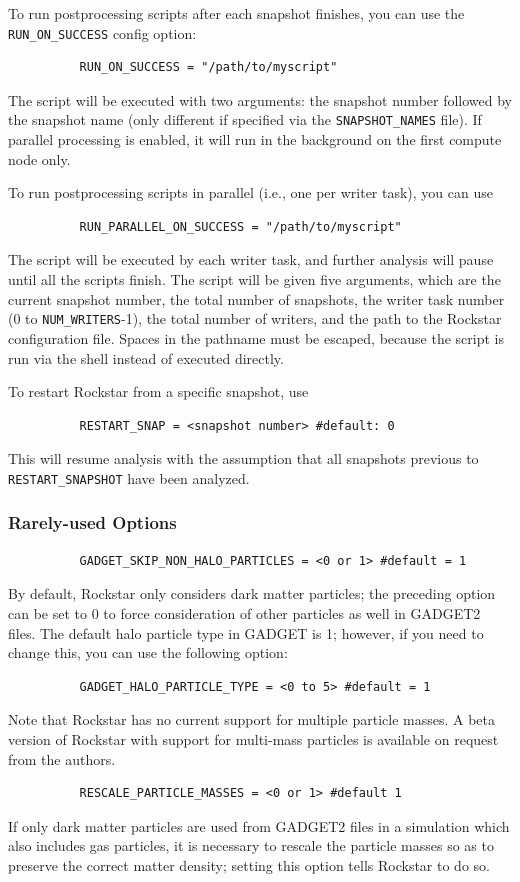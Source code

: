 \documentclass[12pt]{article}
\begin{document}
      To run postprocessing scripts after each snapshot finishes, you can use
      the \texttt{RUN\_ON\_SUCCESS} config option:
\begin{verbatim}
      	  RUN_ON_SUCCESS = "/path/to/myscript"
\end{verbatim}
      The script will be executed with two arguments: the snapshot number
      followed by the snapshot name (only different if specified via the
      \texttt{SNAPSHOT\_NAMES} file).  If parallel processing is enabled, it
      will run in the background on the first compute node only.
      
      To run postprocessing scripts in parallel (i.e., one per writer task), you can use 
\begin{verbatim}
      	  RUN_PARALLEL_ON_SUCCESS = "/path/to/myscript"
\end{verbatim}
	The script will be executed by each writer task, and further analysis will pause
	until all the scripts finish.  The script will be given five arguments, which are the current snapshot
	number, the total number of snapshots, the writer task number (0 to \texttt{NUM\_WRITERS}-1),
	the total number of writers, and the path to the Rockstar configuration file.  Spaces in the pathname must be escaped, because the script is run via the shell instead of executed directly.

	To restart Rockstar from a specific snapshot, use
\begin{verbatim}
      	  RESTART_SNAP = <snapshot number> #default: 0
\end{verbatim}
	This will resume analysis with the assumption that all snapshots previous to \texttt{RESTART\_SNAPSHOT} have been analyzed.

\subsubsection{Rarely-used Options}
\begin{verbatim}
      	  GADGET_SKIP_NON_HALO_PARTICLES = <0 or 1> #default = 1
\end{verbatim}
      By default, Rockstar only considers dark matter particles; the preceding
      option can be set to 0 to force consideration of other particles as well
      in GADGET2 files.  The default halo particle type in GADGET is 1; however,
      if you need to change this, you can use the following option:
\begin{verbatim}
          GADGET_HALO_PARTICLE_TYPE = <0 to 5> #default = 1
\end{verbatim}
      Note that Rockstar has no current support for multiple particle masses.  A beta version of Rockstar with support for multi-mass particles is available on request from the authors.
\begin{verbatim}
      	  RESCALE_PARTICLE_MASSES = <0 or 1> #default 1
\end{verbatim}
      If only dark matter particles are used from GADGET2 files in a simulation
      which also includes gas particles, it is necessary to rescale the particle
      masses so as to preserve the correct matter density; setting this option
      tells Rockstar to do so.
\end{document}

